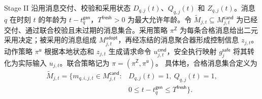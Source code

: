 \documentclass[10pt,a4paper,twocolumn]{article}
\begin{document}
Stage II 沿用消息交付、校验和采用状态 $D_{q,j}(t)$、$Q_{q,j}(t)$ 和 $Z_{q,j}(t)$。消息 $q$ 在时刻 $t$ 的年龄为 $t-t_q^{\mathsf{gen}}$，$T^{\mathsf{fresh}}>0$ 为最大允许年龄。令 $\widetilde M_{j,t}\subseteq M_{j,t}^{\mathsf{cand}}$ 为已经交付、通过联合校验且未过期的消息集合。采用策略 $\pi^{\mathsf Z}$ 为每条合格消息给出二元采用决定；被采用的消息组成 $M_{j,t}^{\mathsf{adopt}}$，再经冻结的消息聚合器形成控制信息 $z_{j,t}$。动作策略 $\pi^{\mathsf u}$ 根据本地状态和 $z_{j,t}$ 生成请求命令 $u_{j,t}^{\mathsf{cmd}}$，安全执行映射 $g_j^{\mathsf{safe}}$ 将其转化为实际输入 $u_{j,t}$。联合策略记为 $\pi=(\pi^{\mathsf Z},\pi^{\mathsf u})$。
具体地，合格消息集合定义为
\begin{equation*}
\begin{aligned}
\widetilde M_{j,t}=\{m_{q,i,j,t}\in M_{j,t}^{\mathsf{cand}}:
&D_{q,j}(t)=1,\ Q_{q,j}(t)=1,\\
&0\leq t-t_q^{\mathsf{gen}}\leq T^{\mathsf{fresh}}\}.
\end{aligned}
\end{equation*}
\end{document}

